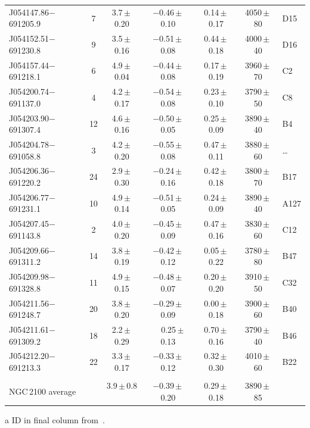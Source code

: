 \documentclass[useAMS,usenatbib]{mn2e}
\def\pp{$\phantom{-}$}
\begin{document}
\begin{table}
\begin{center}
\begin{threeparttable}
\begin{tabular}{lc ccccl}
J054147.86$-$691205.9 & 7  & 3.7\,$\pm$\,0.20 & $-$0.46\,$\pm$\,0.10 & 0.14\,$\pm$\,0.17 & 4050\,$\pm$\,80 & D15\\
J054152.51$-$691230.8 & 9  & 3.5\,$\pm$\,0.16 & $-$0.51\,$\pm$\,0.08 & 0.44\,$\pm$\,0.18 & 4000\,$\pm$\,40 & D16\\
J054157.44$-$691218.1 & 6  & 4.9\,$\pm$\,0.04 & $-$0.44\,$\pm$\,0.08 & 0.17\,$\pm$\,0.19 & 3960\,$\pm$\,70 & C2\\ %
J054200.74$-$691137.0 & 4  & 4.2\,$\pm$\,0.17 & $-$0.54\,$\pm$\,0.08 & 0.23\,$\pm$\,0.10 & 3790\,$\pm$\,50 & C8\\
J054203.90$-$691307.4 & 12 & 4.6\,$\pm$\,0.16 & $-$0.50\,$\pm$\,0.05 & 0.25\,$\pm$\,0.09 & 3890\,$\pm$\,40 & B4\\
J054204.78$-$691058.8 & 3  & 4.2\,$\pm$\,0.20 & $-$0.55\,$\pm$\,0.08 & 0.47\,$\pm$\,0.11 & 3880\,$\pm$\,60 & \ldots\\
J054206.36$-$691220.2 & 24 & 2.9\,$\pm$\,0.30 & $-$0.24\,$\pm$\,0.16 & 0.42\,$\pm$\,0.18 & 3800\,$\pm$\,70 & B17\\
J054206.77$-$691231.1 & 10 & 4.9\,$\pm$\,0.14 & $-$0.51\,$\pm$\,0.05 & 0.24\,$\pm$\,0.09 & 3890\,$\pm$\,40 & A127\\
J054207.45$-$691143.8 & 2  & 4.0\,$\pm$\,0.20 & $-$0.45\,$\pm$\,0.09 & 0.47\,$\pm$\,0.16 & 3830\,$\pm$\,60 & C12\\
J054209.66$-$691311.2 & 14 & 3.8\,$\pm$\,0.19 & $-$0.42\,$\pm$\,0.12 & 0.05\,$\pm$\,0.22 & 3780\,$\pm$\,80 & B47\\
J054209.98$-$691328.8 & 11 & 4.9\,$\pm$\,0.15 & $-$0.48\,$\pm$\,0.07 & 0.20\,$\pm$\,0.20 & 3910\,$\pm$\,50 & C32\\
J054211.56$-$691248.7 & 20 & 3.8\,$\pm$\,0.20 & $-$0.29\,$\pm$\,0.09 & 0.00\,$\pm$\,0.18 & 3900\,$\pm$\,60 & B40\\
J054211.61$-$691309.2 & 18 & 2.2\,$\pm$\,0.29 & \pp0.25\,$\pm$\,0.13 & 0.70\,$\pm$\,0.16 & 3790\,$\pm$\,40 & B46\\
J054212.20$-$691213.3 & 22 & 3.3\,$\pm$\,0.17 & $-$0.33\,$\pm$\,0.12 & 0.32\,$\pm$\,0.30 & 4010\,$\pm$\,60 & B22\\
\\
NGC\,2100 average & & 3.9\,$\pm$\,0.8$\phantom{0}$ & $-$0.39\,$\pm$\,0.20 &  0.29\,$\pm$\,0.18 & 3890\,$\pm$\,85 &\\
  \hline
  \end{tabular}
\begin{tablenotes}
    \item [a] ID in final column from{~\cite{1974A&AS...15..261R}}.
\end{tablenotes}
  \end{threeparttable}
  \end{center}
\end{table}
\end{document}
